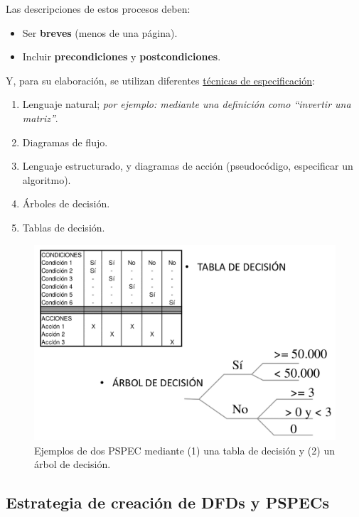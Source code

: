 Las descripciones de estos procesos deben:

\begin{itemize}
    \item Ser \textbf{breves} (menos de una página).
    \item Incluir \textbf{precondiciones} y \textbf{postcondiciones}.
\end{itemize}

Y, para su elaboración, se utilizan diferentes \uline{técnicas de especificación}:

\begin{enumerate}
    \item Lenguaje natural; \textit{por ejemplo: mediante una definición como ``invertir una matriz''}.
    \item Diagramas de flujo.
    \item Lenguaje estructurado, y diagramas de acción (pseudocódigo, especificar un algoritmo). 
    \item Árboles de decisión.
    \item Tablas de decisión.
\end{enumerate}

\begin{figure}[h!]
    \centering
    \includegraphics[width=0.6\linewidth]{Resources/Tema5/ejemplosPSPEC.png}
    \caption{Ejemplos de dos PSPEC mediante (1) una tabla de decisión y (2) un árbol de decisión.}
    \label{fig:ejemplosPSPEC}
\end{figure}

\subsection{Estrategia de creación de DFDs y PSPECs}

